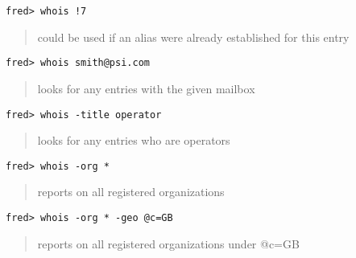 \begin{verbatim}
fred> whois !7
\end{verbatim}
\begin{quote}
could be used if an alias were already established for this entry
\end{quote}

\begin{verbatim}
fred> whois smith@psi.com
\end{verbatim}
\begin{quote}
looks for any entries with the given mailbox
\end{quote}

\begin{verbatim}
fred> whois -title operator
\end{verbatim}
\begin{quote}
looks for any entries who are operators
\end{quote}

\begin{verbatim}
fred> whois -org *
\end{verbatim}
\begin{quote}
reports on all registered organizations
\end{quote}

\begin{verbatim}
fred> whois -org * -geo @c=GB
\end{verbatim}
\begin{quote}
reports on all registered organizations under @c=GB
\end{quote}


